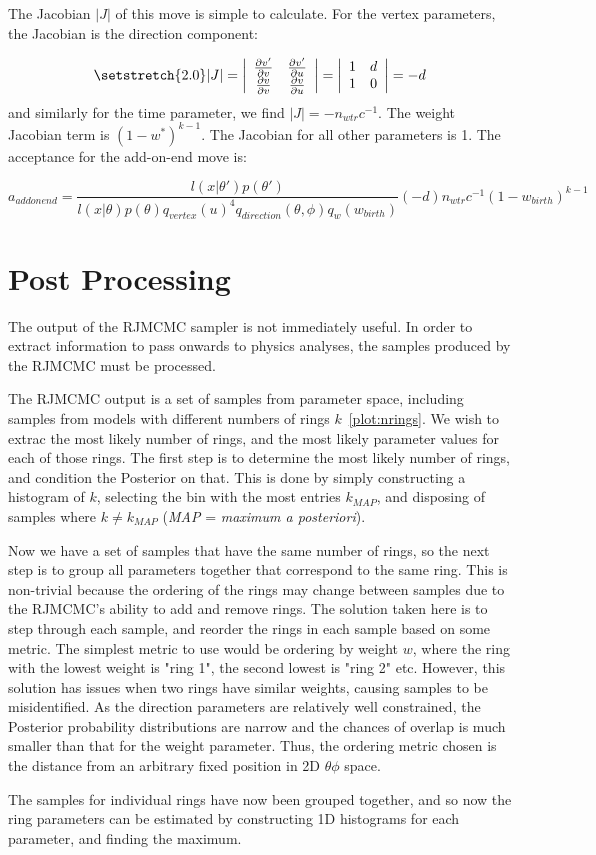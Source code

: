 \documentclass[11pt]{article} %
\begin{document}
The Jacobian $|J|$ of this move is simple to calculate. For the vertex parameters, the Jacobian is the direction component:

\begin{equation}
{\setstretch{2.0}
 |J| = \left| \begin{array}{ccc}
\frac{\partial v'}{\partial v} & \frac{\partial v'}{\partial u}  \\
\frac{\partial v}{\partial v} & \frac{\partial v}{\partial u}  \end{array} \right| = 
\left| \begin{array}{ccc}
1 & d \\
1 & 0 
\end{array} \right| = -d
}
\end{equation}
and similarly for the time parameter, we find $|J| = -n_{wtr}c^{-1}$. The weight Jacobian term is $(1-w^{*})^{k-1}$. The Jacobian for all other parameters is 1. The acceptance for the add-on-end move is:

\begin{equation}\label{eq:addonend}
a_{addonend} = \frac{l(x|\theta')p(\theta')} {l(x|\theta)p(\theta)q_{vertex}(u)^{4}q_{direction}(\theta,\phi)q_{w}(w_{birth})}(-d)n_{wtr}c^{-1}(1-w_{birth})^{k-1}
\end{equation}

\section{Post Processing}
The output of the RJMCMC sampler is not immediately useful. In order to extract information to pass onwards to physics analyses, the samples produced by the RJMCMC must be processed.

The RJMCMC output is a set of samples from parameter space, including samples from models with different numbers of rings $k$~\ref{plot:nrings}. We wish to extrac the most likely number of rings, and the most likely parameter values for each of those rings. The first step is to determine the most likely number of rings, and condition the Posterior on that. This is done by simply constructing a histogram of $k$, selecting the bin with the most entries $k_{MAP}$, and disposing of samples where $k\neq k_{MAP}$ (\emph{MAP} = \emph{maximum a posteriori}).

Now we have a set of samples that have the same number of rings, so the next step is to group all parameters together that correspond to the same ring. This is non-trivial because the ordering of the rings may change between samples due to the RJMCMC's ability to add and remove rings. The solution taken here is to step through each sample, and reorder the rings in each sample based on some metric. The simplest metric to use would be ordering by weight $w$, where the ring with the lowest weight is "ring 1", the second lowest is "ring 2" etc. However, this solution has issues when two rings have similar weights, causing samples to be misidentified. As the direction parameters are relatively well constrained, the Posterior probability distributions are narrow and the chances of overlap is much smaller than that for the weight parameter. Thus, the ordering metric chosen is the distance from an arbitrary fixed position in 2D $\theta\phi$ space.

The samples for individual rings have now been grouped together, and so now the ring parameters can be estimated by constructing 1D histograms for each parameter, and finding the maximum.

{}

\end{document}
